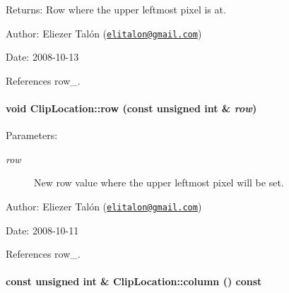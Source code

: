 \begin{Desc}
\item[Returns:]Row where the upper leftmost pixel is at.\end{Desc}
\begin{Desc}
\item[Author:]Eliezer Talón (\href{mailto:elitalon@gmail.com}{\tt elitalon@gmail.com}) \end{Desc}
\begin{Desc}
\item[Date:]2008-10-13 \end{Desc}


References row\_\-.\hypertarget{class_clip_location_5a95f9fae24adf0b6d227714b9b69e2e}{
\paragraph[row]{\setlength{\rightskip}{0pt plus 5cm}void ClipLocation::row (const unsigned int \& {\em row})}\hfill}
\label{class_clip_location_5a95f9fae24adf0b6d227714b9b69e2e}


\begin{Desc}
\item[Parameters:]
\begin{description}
\item[{\em row}]New row value where the upper leftmost pixel will be set.\end{description}
\end{Desc}
\begin{Desc}
\item[Author:]Eliezer Talón (\href{mailto:elitalon@gmail.com}{\tt elitalon@gmail.com}) \end{Desc}
\begin{Desc}
\item[Date:]2008-10-11 \end{Desc}


References row\_\-.\hypertarget{class_clip_location_50409bab2a256787fcc59e5d213d6a58}{
\paragraph[column]{\setlength{\rightskip}{0pt plus 5cm}const unsigned int \& ClipLocation::column () const}\hfill}
\label{class_clip_location_50409bab2a256787fcc59e5d213d6a58}


